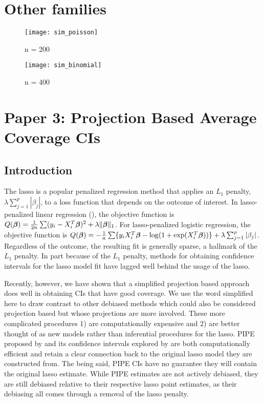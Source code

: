 \section{Other families}
\begin{figure}[hbtp]
    \begin{center}
    \texttt{[image: sim\_poisson]}
    \caption{\label{Fig:sim_pois} n = 200}
    \end{center}
\end{figure}

\begin{figure}[hbtp]
    \begin{center}
    \texttt{[image: sim\_binomial]}
    \caption{\label{Fig:sim_binomial} n = 400}
    \end{center}
\end{figure}


\newpage
\section{Paper 3: Projection Based Average Coverage CIs}

\subsection{Introduction}

The lasso is a popular penalized regression method that applies an $L_1$ penalty, $\lambda \sum_{j = 1}^p |\beta_j|$, to a loss function that depends on the outcome of interest. In lasso-penalized linear regression (\cite{Tibshirani1996}), the objective function is $Q(\boldsymbol{\beta}) = \frac{1}{2n} \sum ( y_i - X_i^T \boldsymbol{\beta} )^2 + \lambda\lVert\boldsymbol{\beta}\rVert_1$. For lasso-penalized logistic regression, the objective function is $Q(\boldsymbol{\beta}) = -\frac{1}{n} \sum\lbrace y_i X_i^T\boldsymbol{\beta} - \log(1+\exp(X_i^T \boldsymbol{\beta})) \rbrace + \lambda \sum_{j = 1}^p |\beta_j|$. Regardless of the outcome, the resulting fit is generally sparse, a hallmark of the $L_1$ penalty. In part because of the $L_1$ penalty, methods for obtaining confidence intervals for the lasso model fit have lagged well behind the usage of the lasso. 

Recently, however, we have shown that a simplified projection based approach does well in obtaining CIs that have good coverage. We use the word simplified here to draw contrast to other debiased methods which could also be considered projection based but whose projections are more involved. These more complicated procedures 1) are computationally expensive and 2) are better thought of as new models rather than inferential procedures for the lasso. PIPE proposed by  and its confidence intervals explored by  are both computationally efficient and retain a clear connection back to the original lasso model they are constructed from. The being said, PIPE CIs have no guarantee they will contain the original lasso estimate. While PIPE estimates are not actively debiased, they are still debiased relative to their respective lasso point estimates, as their debiasing all comes through a removal of the lasso penalty. 

